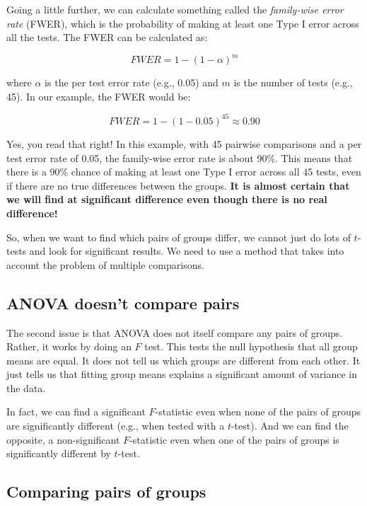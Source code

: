 \documentclass[
  letterpaper,
  8pt,
  a4paper]{book}
\newcounter{none} %
\begin{document}
Going a little further, we can calculate something called the
\emph{family-wise error rate} (FWER), which is the probability of making
at least one Type I error across all the tests. The FWER can be
calculated as:

\[FWER = 1 - (1 - \alpha)^m\]

where \(\alpha\) is the per test error rate (e.g., 0.05) and \(m\) is
the number of tests (e.g., 45). In our example, the FWER would be:

\[FWER = 1 - (1 - 0.05)^{45} \approx 0.90\]

Yes, you read that right! In this example, with 45 pairwise comparisons
and a per test error rate of 0.05, the family-wise error rate is about
90\%. This means that there is a 90\% chance of making at least one Type
I error across all 45 tests, even if there are no true differences
between the groups. \textbf{It is almost certain that we will find at
significant difference even though there is no real difference!}

So, when we want to find which pairs of groups differ, we cannot just do
lots of \(t\)-tests and look for significant results. We need to use a
method that takes into account the problem of multiple comparisons.

\subsection*{ANOVA doesn't compare
pairs}\label{anova-doesnt-compare-pairs}

The second issue is that ANOVA does not itself compare any pairs of
groups. Rather, it works by doing an \(F\) test. This tests the null
hypothesis that all group means are equal. It does not tell us which
groups are different from each other. It just tells us that fitting
group means explains a significant amount of variance in the data.

In fact, we can find a significant \(F\)-statistic even when none of the
pairs of groups are significantly different (e.g., when tested with a
\(t\)-test). And we can find the opposite, a non-significant
\(F\)-statistic even when one of the pairs of groups is significantly
different by \(t\)-test.

\subsection*{Comparing pairs of groups}\label{comparing-pairs-of-groups}
\end{document}
